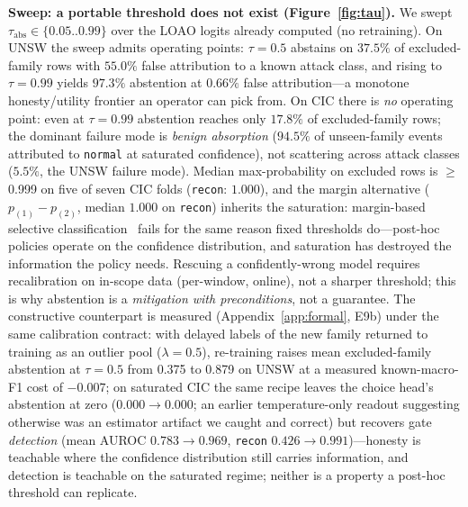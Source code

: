 \documentclass[sigconf,anonymous=false]{acmart}
\begin{document}
\textbf{Sweep: a portable threshold does not exist (Figure~\ref{fig:tau}).} We swept $\tau_{\mathrm{abs}}\in\{0.05..0.99\}$ over the LOAO logits already computed (no retraining). On UNSW the sweep admits operating points: $\tau{=}0.5$ abstains on $37.5\%$ of excluded-family rows with $55.0\%$ false attribution to a known attack class, and rising to $\tau{=}0.99$ yields $97.3\%$ abstention at $0.66\%$ false attribution---a monotone honesty/utility frontier an operator can pick from. On CIC there is \emph{no} operating point: even at $\tau{=}0.99$ abstention reaches only $17.8\%$ of excluded-family rows; the dominant failure mode is \emph{benign absorption} ($94.5\%$ of unseen-family events attributed to \texttt{normal} at saturated confidence), not scattering across attack classes ($5.5\%$, the UNSW failure mode). Median max-probability on excluded rows is $\ge$0.999 on five of seven CIC folds (\texttt{recon}: $1.000$), and the margin alternative ($p_{(1)}-p_{(2)}$, median $1.000$ on \texttt{recon}) inherits the saturation: margin-based selective classification~\cite{geifman2017} fails for the same reason fixed thresholds do---post-hoc policies operate on the confidence distribution, and saturation has destroyed the information the policy needs. Rescuing a confidently-wrong model requires recalibration on in-scope data (per-window, online), not a sharper threshold; this is why abstention is a \emph{mitigation with preconditions}, not a guarantee. The constructive counterpart is measured (Appendix~\ref{app:formal}, E9b) under the same calibration contract: with delayed labels of the new family returned to training as an outlier pool ($\lambda{=}0.5$), re-training raises mean excluded-family abstention at $\tau{=}0.5$ from 0.375 to 0.879 on UNSW at a measured known-macro-F1 cost of $-0.007$; on saturated CIC the same recipe leaves the choice head's abstention at zero ($0.000\to0.000$; an earlier temperature-only readout suggesting otherwise was an estimator artifact we caught and correct) but recovers gate \emph{detection} (mean AUROC $0.783\to0.969$, \texttt{recon} $0.426\to0.991$)---honesty is teachable where the confidence distribution still carries information, and detection is teachable on the saturated regime; neither is a property a post-hoc threshold can replicate.
\end{document}
